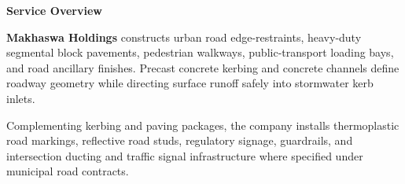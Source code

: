 \documentclass[a4paper,11pt]{article}
\begin{document}
\noindent
\begin{minipage}[t]{0.63\textwidth}
    \vspace{0pt}
    {\large\bfseries\color{mhnavy} Service Overview}
    \vspace{0.08cm}

    {\fontsize{8.7pt}{12.3pt}\selectfont\color{mhtext}
    \textbf{Makhaswa Holdings} constructs urban road edge-restraints, heavy-duty segmental block pavements, pedestrian walkways, public-transport loading bays, and road ancillary finishes. Precast concrete kerbing and concrete channels define roadway geometry while directing surface runoff safely into stormwater kerb inlets.
    }

    \vspace{0.15cm}

    {\fontsize{8.7pt}{12.3pt}\selectfont\color{mhtext}
    Complementing kerbing and paving packages, the company installs thermoplastic road markings, reflective road studs, regulatory signage, guardrails, and intersection ducting and traffic signal infrastructure where specified under municipal road contracts.
    }
\end{minipage}
\hfill
\end{document}
